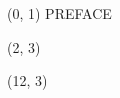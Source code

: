 \documentclass[10pt]{article}
\begin{document}
\begin{textblock}{23} (0, 1)
\center\huge PREFACE
\end{textblock}

\begin{textblock}{9} (2, 3)
    {}   
\end{textblock}

\begin{textblock}{9} (12, 3)
    {}
\end{textblock}
\end{document}
